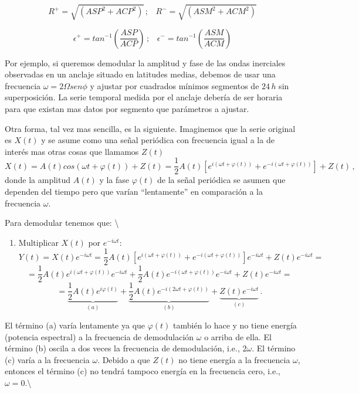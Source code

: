 \documentclass[
]{agujournal2019}
\providecommand{\tightlist}{%
  \setlength{\itemsep}{0pt}\setlength{\parskip}{0pt}}\usepackage{longtable,booktabs,array}
\begin{document}
\[R^+=\sqrt{\left( ASP^2 + ACP^2\right)}\,;\,\,\,\,\,R^-=\sqrt{\left( ASM^2 + ACM^2\right)}\]

\[\epsilon^+=tan^{-1}\left(\frac{ASP}{ACP}\right)\,;\,\,\,\,\,\epsilon^-=tan^{-1}\left(\frac{ASM}{ACM}\right)\]

Por ejemplo, si queremos demodular la amplitud y fase de las ondas
inerciales observadas en un anclaje situado en latitudes medias, debemos
de usar una frecuencia \(\omega=2\Omega sen\phi\) y ajustar por
cuadrados mínimos segmentos de \(24\,{ h}\) sin superposición. La serie
temporal medida por el anclaje debería de ser horaria para que existan
mas datos por segmento que parámetros a ajustar.

Otra forma, tal vez mas sencilla, es la siguiente. Imaginemos que la
serie original es \(X(t)\) y se asume como una señal periódica con
frecuencia igual a la de interés mas otras cosas que llamamos \(Z(t)\)
\[X(t)=A(t)cos\left(\omega t + \varphi(t)\right) + Z(t)= \frac{1}{2}A(t)
       \left[e^{i(\omega t + \varphi(t))} + e^{-i(\omega t + \varphi(t))} \right] + Z(t)\,,\]
donde la amplitud \(A(t)\) y la fase \(\varphi(t)\) de la señal
periódica se asumen que dependen del tiempo pero que varían
``lentamente'' en comparación a la frecuencia \(\omega\).

Para demodular tenemos que: \textbackslash{}

\begin{enumerate}
\def\labelenumi{(\arabic{enumi})}
\tightlist
\item
  Multiplicar \(X(t)\) por \(e^{-i\omega t}\):
  \[Y(t)=X(t)e^{-i\omega t}=\frac{1}{2}A(t)
     \left[e^{i(\omega t + \varphi(t))} + e^{-i(\omega t + \varphi(t))} \right]e^{-i\omega t} + Z(t)e^{-i\omega t}=\]
  \[=\frac{1}{2}A(t)e^{i(\omega t + \varphi(t))}e^{-i\omega t} + \frac{1}{2}A(t)e^{-i(\omega t + \varphi(t))}e^{-i\omega t} +
  Z(t)e^{-i\omega t}=\]
  \[=\underbrace{\frac{1}{2}A(t)e^{i\varphi(t)}}_{(a)} + \underbrace{\frac{1}{2}A(t)e^{-i(2\omega t + \varphi(t))}}_{(b)} +
  \underbrace{Z(t)e^{-i\omega t}}_{(c)}\,.\]
\end{enumerate}

El término (a) varía lentamente ya que \(\varphi(t)\) también lo hace y
no tiene energía (potencia espectral) a la frecuencia de demodulación
\(\omega\) o arriba de ella. El término (b) oscila a dos veces la
frecuencia de demodulación, i.e., \(2\omega\). El término (c) varía a la
frecuencia \(\omega\). Debido a que \(Z(t)\) no tiene energía a la
frecuencia \(\omega\), entonces el término (c) no tendrá tampoco energía
en la frecuencia cero, i.e., \(\omega=0\).\textbackslash{}
\end{document}

